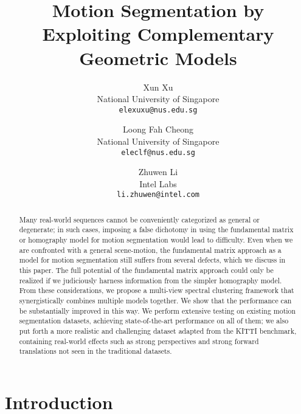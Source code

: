 \documentclass[10pt,twocolumn,letterpaper]{article}
\begin{document}
\title{Motion Segmentation by Exploiting Complementary Geometric Models}

\author{Xun Xu\\
National University of Singapore\\
{\tt\small elexuxu@nus.edu.sg}
\and
Loong Fah Cheong\\
National University of Singapore\\
{\tt\small eleclf@nus.edu.sg}
\and
Zhuwen Li\\
Intel Labs\\
{\tt\small li.zhuwen@intel.com}
}

\maketitle


\begin{abstract}
Many real-world sequences cannot be conveniently categorized as general or degenerate; in such cases, imposing a false dichotomy in using the fundamental matrix or homography model for motion segmentation would lead to difficulty. Even when we are confronted with a general scene-motion, the fundamental matrix approach as a model for motion segmentation still suffers from several defects, which we discuss in this paper. The full potential of the fundamental matrix approach could only be realized if we judiciously harness information from the simpler homography model. From these considerations, we propose a multi-view spectral clustering framework that synergistically combines multiple models together. We show that the performance can be substantially improved in this way. We perform extensive testing on existing motion segmentation datasets, achieving state-of-the-art performance on all of them; we also put forth a more realistic and challenging dataset adapted from the KITTI benchmark, containing real-world effects such as strong perspectives and strong forward translations not seen in the traditional datasets. 

\end{abstract}

\vspace{-0.2cm}
\section{Introduction}
 
\end{document}
